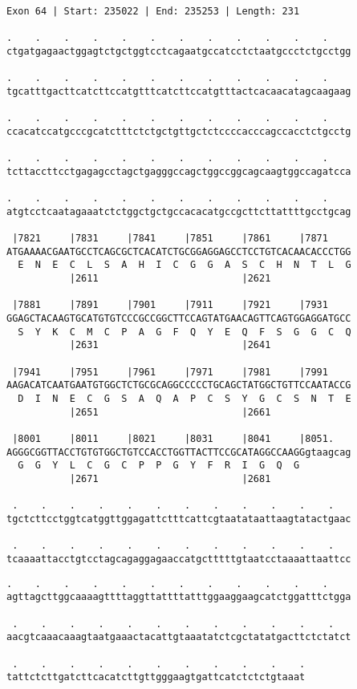 \documentclass{article}
\begin{document}
\begin{Verbatim}[fontfamily=courier]
Exon 64 | Start: 235022 | End: 235253 | Length: 231

.    .    .    .    .    .    .    .    .    .    .    .    
ctgatgagaactggagtctgctggtcctcagaatgccatcctctaatgccctctgcctgg

.    .    .    .    .    .    .    .    .    .    .    .    
tgcatttgacttcatcttccatgtttcatcttccatgtttactcacaacatagcaagaag

.    .    .    .    .    .    .    .    .    .    .    .    
ccacatccatgcccgcatctttctctgctgttgctctccccacccagccacctctgcctg

.    .    .    .    .    .    .    .    .    .    .    .    
tcttaccttcctgagagcctagctgagggccagctggccggcagcaagtggccagatcca

.    .    .    .    .    .    .    .    .    .    .    .    
atgtcctcaatagaaatctctggctgctgccacacatgccgcttcttattttgcctgcag

 |7821     |7831     |7841     |7851     |7861     |7871    
ATGAAAACGAATGCCTCAGCGCTCACATCTGCGGAGGAGCCTCCTGTCACAACACCCTGG
  E  N  E  C  L  S  A  H  I  C  G  G  A  S  C  H  N  T  L  G
           |2611                         |2621              

 |7881     |7891     |7901     |7911     |7921     |7931    
GGAGCTACAAGTGCATGTGTCCCGCCGGCTTCCAGTATGAACAGTTCAGTGGAGGATGCC
  S  Y  K  C  M  C  P  A  G  F  Q  Y  E  Q  F  S  G  G  C  Q
           |2631                         |2641              

 |7941     |7951     |7961     |7971     |7981     |7991    
AAGACATCAATGAATGTGGCTCTGCGCAGGCCCCCTGCAGCTATGGCTGTTCCAATACCG
  D  I  N  E  C  G  S  A  Q  A  P  C  S  Y  G  C  S  N  T  E
           |2651                         |2661              

 |8001     |8011     |8021     |8031     |8041     |8051.   
AGGGCGGTTACCTGTGTGGCTGTCCACCTGGTTACTTCCGCATAGGCCAAGGgtaagcag
  G  G  Y  L  C  G  C  P  P  G  Y  F  R  I  G  Q  G         
           |2671                         |2681              

 .    .    .    .    .    .    .    .    .    .    .    .   
tgctcttcctggtcatggttggagattctttcattcgtaatataattaagtatactgaac

 .    .    .    .    .    .    .    .    .    .    .    .   
tcaaaattacctgtcctagcagaggagaaccatgctttttgtaatcctaaaattaattcc

\end{Verbatim}
\newpage
\begin{Verbatim}[fontfamily=courier]
 .    .    .    .    .    .    .    .    .    .    .    .   
agttagcttggcaaaagttttaggttattttatttggaaggaagcatctggatttctgga

 .    .    .    .    .    .    .    .    .    .    .    .   
aacgtcaaacaaagtaatgaaactacattgtaaatatctcgctatatgacttctctatct

 .    .    .    .    .    .    .    .    .    .    .
tattctcttgatcttcacatcttgttgggaagtgattcatctctctgtaaat
\end{Verbatim}
\end{document}
